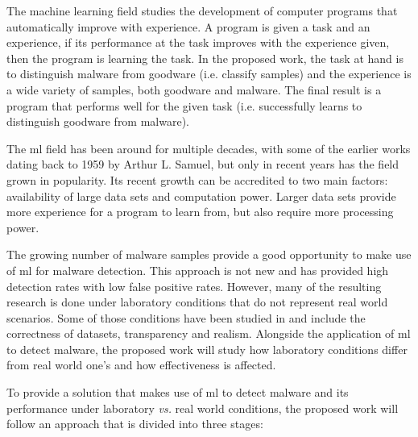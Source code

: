 \documentclass{llncs}
\begin{document}
The machine learning field studies the development of computer programs that automatically improve with experience. A program is given a task and an experience, if its performance at the task improves with the experience given, then the program is learning the task\cite{mitchell:ml}. In the proposed work, the task at hand is to distinguish malware from goodware (i.e. classify samples) and the experience is a wide variety of samples, both goodware and malware. The final result is a program that performs well for the given task (i.e. successfully learns to distinguish goodware from malware).

The \gls{ml} field has been around for multiple decades, with some of the earlier works dating back to 1959 by Arthur L. Samuel\cite{samuel:studies}, but only in recent years has the field grown in popularity. Its recent growth can be accredited to two main factors: availability of large data sets and computation power. Larger data sets provide more experience for a program to learn from, but also require more processing power.

The growing number of malware samples provide a good opportunity to make use of \gls{ml} for malware detection. This approach is not new and has provided high detection rates with low false positive rates\cite{miller:rev_int,nissim:al_pdf,perdisci:behavior,rieck:dynamic,schultz:data_mining}. However, many of the resulting research is done under laboratory conditions that do not represent real world scenarios. Some of those conditions have been studied in \cite{rossow:practices} and include the correctness of datasets, transparency and realism. Alongside the application of \gls{ml} to detect malware, the proposed work will study how laboratory conditions differ from real world one's and how effectiveness is affected.

To provide a solution that makes use of \gls{ml} to detect malware and its performance under laboratory \textit{vs.} real world conditions, the proposed work will follow an approach that is divided into three stages:
\end{document}
